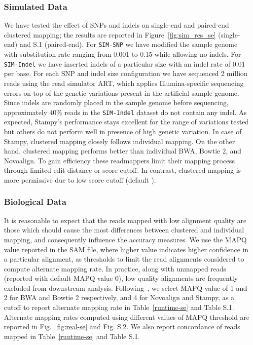 \documentclass[a4paper]{article}
\begin{document}
\subsubsection{Simulated Data}
We have tested the effect of SNPs and indels on single-end and
paired-end clustered mapping; the results are reported in
Figure~\ref{fig:sim_res_se} (single-end) and S.1 (paired-end). For {\tt SIM-SNP} we have modified the sample
genome with substitution rate ranging from 0.001 to 0.15 while allowing
no indels. For {\tt SIM-Indel} we have inserted indels of a particular size
 with an indel rate of 0.01 per base.
For each SNP and indel size configuration we have sequenced 2 million
reads using the read simulator ART, which applies Illumina-specific
sequencing errors on top of the genetic variations present in the
artificial sample genome.
Since indels are randomly placed in the sample genome
before sequencing, approximately 40\% reads in the {\tt SIM-Indel}
dataset do not contain any indel. As expected, Stampy's performance stays
excellent for the range of variations tested but others do not perform well
in presence of high genetic variation. In case of Stampy,
clustered mapping closely follows individual mapping.
On the other hand, clustered mapping performs better
than individual BWA, Bowtie 2, and Novoalign.
To gain efficiency these readmappers limit their mapping process through
limited edit distance or score cutoff.
In contrast, clustered mapping is more permissive due to low
score cutoff (default ).

\subsubsection{Biological Data}
It is reasonable to expect that the reads mapped with low alignment quality are those which should cause the most differences between clustered and individual mapping, and consequently influence the accuracy measures. We use the MAPQ value reported in the SAM file, where higher value indicates higher confidence in a particular alignment, as thresholds to limit the read alignments considered to compute alternate mapping rate. In practice, along with unmapped reads (reported with default MAPQ value 0), low quality alignments are frequently excluded from downstream analysis.  Following~\cite{Li15072009}, we select MAPQ value of 1 and 2 for BWA and Bowtie 2 respectively, and 4 for Novoalign and Stampy, as a cutoff to report alternate mapping rate in Table~\ref{runtime-se} and Table S.1. Alternate mapping rates computed using different values of MAPQ threshold are reported in Fig.~\ref{fig:real-se} and Fig. S.2. We also report concordance of reads mapped in Table~\ref{runtime-se} and Table S.1.
\end{document}

